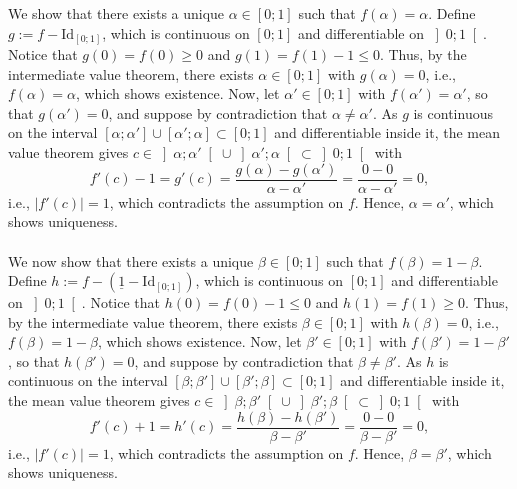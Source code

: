\begin{solution}
    We show that there exists a unique \( \alpha \in \left[0;1\right] \) such that \( f\left(\alpha\right) = \alpha \). Define \( g := f-\mathrm{Id}_{\left[0;1\right]} \), which is continuous on \( \left[0;1\right] \) and differentiable on \( \left]0;1\right[ \). Notice that \( g\left(0\right) = f\left(0\right) \geq 0 \) and \( g\left(1\right) = f\left(1\right)-1 \leq 0 \). Thus, by the intermediate value theorem, there exists \( \alpha \in \left[0;1\right] \) with \( g\left(\alpha\right) = 0 \), i.e., \( f\left(\alpha\right) = \alpha \), which shows existence. Now, let \( \alpha' \in \left[0;1\right] \) with \( f\left(\alpha'\right) = \alpha' \), so that \( g\left(\alpha'\right) = 0 \), and suppose by contradiction that \( \alpha \neq \alpha' \). As \( g \) is continuous on the interval \( \left[\alpha;\alpha'\right] \cup \left[\alpha';\alpha\right] \subset \left[0;1\right] \) and differentiable inside it, the mean value theorem gives \( c \in \left]\alpha;\alpha'\right[ \cup \left]\alpha';\alpha\right[ \subset \left]0;1\right[ \) with
    \[
        f'\left(c\right)-1 = g'\left(c\right) = \frac{g\left(\alpha\right)-g\left(\alpha'\right)}{\alpha-\alpha'} = \frac{0-0}{\alpha-\alpha'} = 0,
    \]
    i.e., \( \left|f'\left(c\right)\right| = 1 \), which contradicts the assumption on \( f \). Hence, \( \alpha = \alpha' \), which shows uniqueness.
    \\\\
    We now show that there exists a unique \( \beta \in \left[0;1\right] \) such that \( f\left(\beta\right) = 1-\beta \). Define \( h := f-\left(\underline{1}-\mathrm{Id}_{\left[0;1\right]}\right) \), which is continuous on \( \left[0;1\right] \) and differentiable on \( \left]0;1\right[ \). Notice that \( h\left(0\right) = f\left(0\right)-1 \leq 0 \) and \( h\left(1\right) = f\left(1\right) \geq 0 \). Thus, by the intermediate value theorem, there exists \( \beta \in \left[0;1\right] \) with \( h\left(\beta\right) = 0 \), i.e., \( f\left(\beta\right) = 1-\beta \), which shows existence. Now, let \( \beta' \in \left[0;1\right] \) with \( f\left(\beta'\right) = 1-\beta' \), so that \( h\left(\beta'\right) = 0 \), and suppose by contradiction that \( \beta \neq \beta' \). As \( h \) is continuous on the interval \( \left[\beta;\beta'\right] \cup \left[\beta';\beta\right] \subset \left[0;1\right] \) and differentiable inside it, the mean value theorem gives \( c \in \left]\beta;\beta'\right[ \cup \left]\beta';\beta\right[ \subset \left]0;1\right[ \) with
    \[
        f'\left(c\right)+1 = h'\left(c\right) = \frac{h\left(\beta\right)-h\left(\beta'\right)}{\beta-\beta'} = \frac{0-0}{\beta-\beta'} = 0,
    \]
    i.e., \( \left|f'\left(c\right)\right| = 1 \), which contradicts the assumption on \( f \). Hence, \( \beta = \beta' \), which shows uniqueness.
\end{solution}
